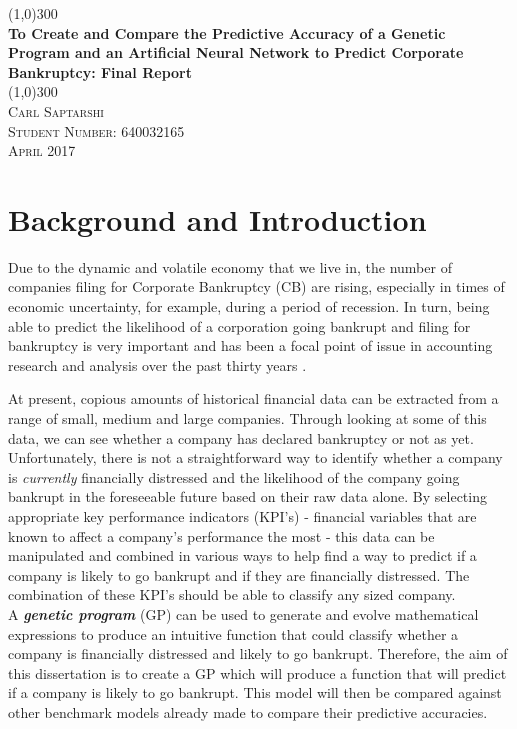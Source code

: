 \documentclass[11pt]{article}
\begin{document}
	\begin{titlepage}
		\begin{center}
			\line(1,0){300}\\
			[0.25in]
			\huge{\bfseries To Create and Compare the Predictive Accuracy of a Genetic Program and an Artificial Neural Network to Predict Corporate Bankruptcy: Final Report}\\
			\line(1,0){300}\\
			[1.5cm]
			
			 \textsc{Carl Saptarshi}\\
			 \textsc{\large  Student Number: 640032165 \\
			 April 2017}
			 
		\end{center}
	\end{titlepage}

\tableofcontents
\thispagestyle{empty}

\cleardoublepage
\setcounter{page}{1}
\section{Background and Introduction }\label{sec:intro}%
Due to the dynamic and volatile economy that we live in, the number of companies filing for Corporate Bankruptcy (CB) are rising, especially in times of economic uncertainty, for example, during a period of recession. In turn, being able to predict the likelihood of a corporation going bankrupt and filing for bankruptcy is very important and has been a focal point of issue in accounting research and analysis over the past thirty years \cite{?}.

At present, copious amounts of historical financial data can be extracted from a range of small, medium and large companies. Through looking at some of this data, we can see whether a company has declared bankruptcy or not as yet. Unfortunately, there is not a straightforward way to identify whether a company is \textit{currently} financially distressed and the likelihood of the company going bankrupt in the foreseeable future based on their raw data alone. By selecting appropriate key performance indicators (KPI's) - financial variables that are known to affect a company's performance the most - this data can be manipulated and combined in various ways to help find a way to predict if a company is likely to go bankrupt and if they are financially distressed. The combination of these KPI's should be able to classify any sized company. \\
A \textbf{\textit{genetic program}} (GP) can be used to generate and evolve mathematical expressions to produce an intuitive function that could classify whether a company is financially distressed and likely to go bankrupt. Therefore, the aim of this dissertation is to create a GP which will produce a function that will predict if a company is likely to go bankrupt. This model will then be compared against other benchmark models already made to compare their predictive accuracies. \\
\end{document}
